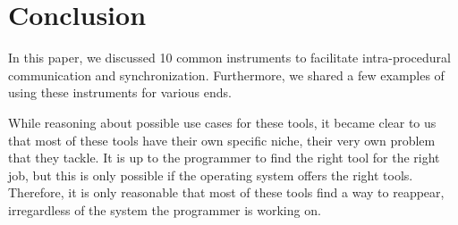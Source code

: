 \newpage
\section{Conclusion}
In this paper, we discussed 10 common instruments to facilitate intra-procedural communication and synchronization. 
Furthermore, we shared a few examples of using these instruments for various ends. 

While reasoning about possible use cases for these tools, it became clear to us that most of these tools have their own specific niche, their very own problem that they tackle. 
It is up to the programmer to find the right tool for the right job, but this is only possible if the operating system offers the right tools. 
Therefore, it is only reasonable that most of these tools find a way to reappear, irregardless of the system the programmer is working on.